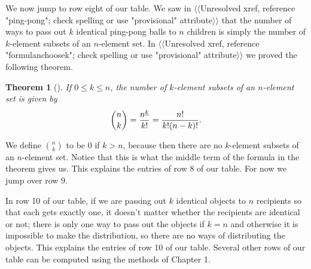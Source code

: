 \documentclass[10pt,]{book}
\theoremstyle{plain}
\newtheorem{theorem}{Theorem}[section]
\theoremstyle{definition}
\numberwithin{equation}{chapter}
\begin{document}
\par
We now jump to row eight of our table. We saw in {$\langle\langle$Unresolved xref, reference "ping-pong"; check spelling or use "provisional" attribute$\rangle\rangle$} that the number of ways to pass out \(k\) identical ping-pong balls to \(n\) children is simply the number of \(k\)-element subsets of an \(n\)-element set. In {$\langle\langle$Unresolved xref, reference "formulanchoosek"; check spelling or use "provisional" attribute$\rangle\rangle$} we proved the following theorem.%
\begin{theorem}[{}]\label{theorem-4}
If \(0\le k \le n\), the number of \(k\)-element subsets of an \(n\)-element set is given by%
\begin{equation*}
{n\choose k} = {n^{\underline{k}}\over k!}
= {n!\over k!(n-k)!}.
\end{equation*}
%
\end{theorem}
We define \(n \choose k\) to be 0 if \(k>n\), because then there are no \(k\)-element subsets of an \(n\)-element set. Notice that this is what the middle term of the formula in the theorem gives us. This explains the entries of row 8 of our table. For now we jump over row 9.%
\par
In row 10 of our table, if we are passing out \(k\) identical objects to \(n\) recipients so that each gets exactly one, it doesn't matter whether the recipients are identical or not; there is only one way to pass out the objects if \(k=n\) and otherwise it is impossible to make the distribution, so there are no ways of distributing the objects. This explains the entries of row 10 of our table. Several other rows of our table can be computed using the methods of Chapter 1.%
\typeout{************************************************}
\typeout{************************************************}
\end{document}
